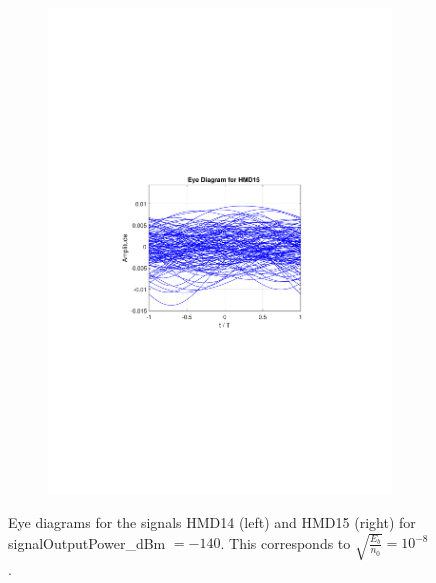 \begin{figure}
\begin{subfigure}{.5\textwidth}
	\end{subfigure}%
	\begin{subfigure}{.5\textwidth}
		\centering
		\includegraphics[clip, trim=5cm 10cm 5cm 10cm, width=\textwidth]{./sdf/m_qam_system/figures/HMD15_eye_diagram_140.pdf}
	\end{subfigure}
	\caption{Eye diagrams for the signals HMD14 (left) and HMD15 (right) for signalOutputPower\_dBm $=-140$. This corresponds to $\sqrt{\frac{E_b}{n_0}}=10^{-8}$.}
	\label{fig:eye_diagram_140}
\end{figure}

